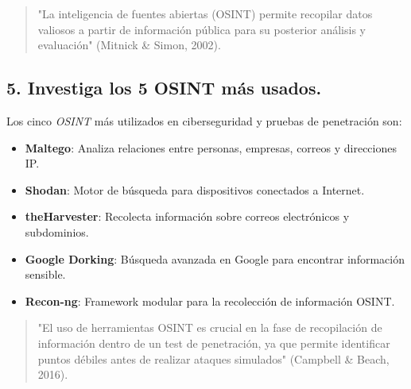 \begin{quote}
    "La inteligencia de fuentes abiertas (OSINT) permite recopilar datos valiosos a partir de información pública para su posterior análisis y evaluación" (Mitnick \& Simon, 2002).
\end{quote}

\subsection{5. Investiga los 5 OSINT más usados.}
Los cinco \textit{OSINT} más utilizados en ciberseguridad y pruebas de penetración son:

\begin{itemize}
    \item \textbf{Maltego}: Analiza relaciones entre personas, empresas, correos y direcciones IP.
    \item \textbf{Shodan}: Motor de búsqueda para dispositivos conectados a Internet.
    \item \textbf{theHarvester}: Recolecta información sobre correos electrónicos y subdominios.
    \item \textbf{Google Dorking}: Búsqueda avanzada en Google para encontrar información sensible.
    \item \textbf{Recon-ng}: Framework modular para la recolección de información OSINT.
\end{itemize}

\begin{quote}
    "El uso de herramientas OSINT es crucial en la fase de recopilación de información dentro de un test de penetración, ya que permite identificar puntos débiles antes de realizar ataques simulados" (Campbell \& Beach, 2016).
\end{quote}
